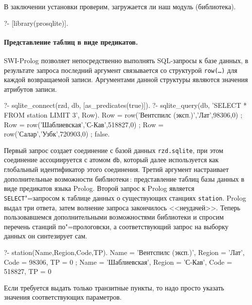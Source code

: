 \documentclass[a4paper,14pt, openany, twoside, draft]{extbook} %
\begin{document}
В заключении установки проверим, загружается ли наш модуль (библиотека).

\begin{proexp}
?- [library(prosqlite)].
\end{proexp}

\paragraph{Представление таблиц в виде предикатов.}  SWI-Prolog позволяет непосредственно выполнять SQL-запросы к базе данных, в результате запроса последний аргумент связывается со структурой \texttt{row(\ldots)} для каждой возвращаемой записи.  Аргументами данной структуры являются значения атрибутов записи.

\begin{proexp}
?- sqlite_connect(rzd, db, [as_predicates(true)]).
?- sqlite_query(db,
        'SELECT * FROM station LIMIT 3', Row).
Row = row('Вентспилс (эксп.)','Лат',98306,0) ;
Row = row('Шаблиевская','С-Кав',518827,0) ;
Row = row('Салар','Узбк',720903,0) ;
false.
\end{proexp}

\noindent{}Первый запрос создает соединение с базой данных \texttt{rzd.sqlite}, при этом соединение ассоциируется с атомом \texttt{db}, который далее используется как глобальный идентификатор этого соединения.  Третий аргумент настраивает дополнительные возможности библиотеки\,: представление таблиц базы данных в виде предикатов языка Prolog.  Второй запрос к Prolog является \foreignlanguage{english}{\texttt{SELECT}}"=запросом к таблице данных о существующих станциях \texttt{station}.  Prolog выдал три ответа, затем волнение запроса закончилось <<неудачей>>.  Теперь пользовавшемся дополнительными возможностями библиотеки и спросим перечень станций по"=прологовски, а соответствующий запрос на выборку данных он синтезирует сам.

\begin{proexp}
?- station(Name,Region,Code,TP).
Name = 'Вентспилс (эксп.)',
Region = 'Лат',        %
Code = 98306,          %
TP = 0 ;               %
Name = 'Шаблиевская',  %
Region = 'С-Кав',
Code = 518827,
TP = 0
\end{proexp}


\noindent{}Если требуется выдать только транзитные пункты, то надо просто указать значения соответствующих параметров.
\end{document}
